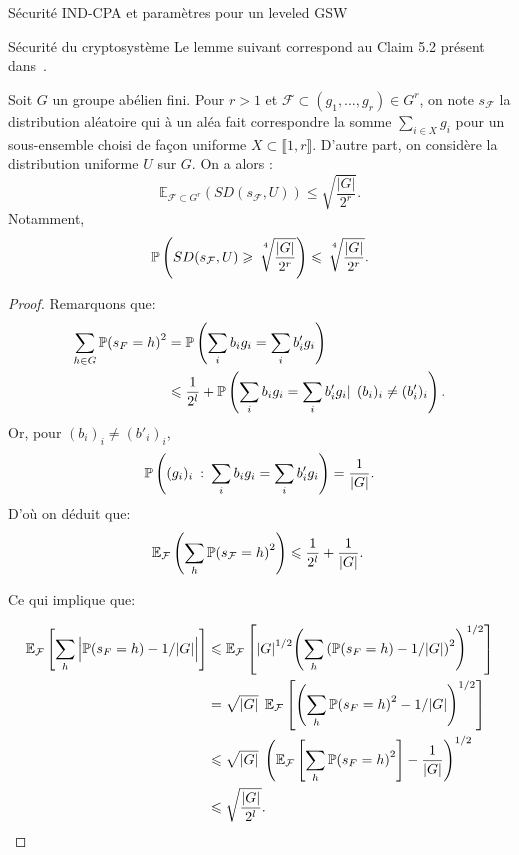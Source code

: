 \begin{section}{Sécurité IND-CPA et paramètres pour un leveled GSW}
\begin{subsection}{Sécurité du cryptosystème}
	Le lemme suivant correspond au Claim 5.2 présent dans~\cite{STOC:Regev05}.

	\begin{lemme}
	Soit $G$ un groupe abélien fini. Pour $r > 1$ et 
	$\mathcal{F} \subset (g_1, \ldots, g_r) \in G^r$, on
	note
	 $s_\mathcal{F}$ la distribution aléatoire qui à un aléa
	 fait correspondre la somme $\sum_{i\in X} g_i$ pour un
	 sous-ensemble choisi de façon uniforme  $X\subset \llbracket
	 1, r \rrbracket$. 
	 D'autre part, on considère la distribution uniforme
	 $U$ sur $G$. On a alors : 
	 \[\mathbb{E}_{\mathcal{F}\subset G^r}(SD(s_\mathcal{F},U)) \leqslant
	   \sqrt{\frac{|G|}{2^r}}.\]
	 Notamment, 
	 \[\mathbb{P}\left(SD(s_\mathcal{F},U) \geqslant
		 \sqrt[\leftroot{-3}\uproot{8}4\:]{\frac{|G|}{2^r}} \right) \leqslant
		 \sqrt[\leftroot{-3}\uproot{8}4\:]{\frac{|G|}{2^r}}.
	 \]
	\end{lemme}
	\begin{proof}
		Remarquons que:
	\begin{align*}
		\sum_{h\in G} {\mathbb{P}(s_F = h)}^2 &= 
		\mathbb{P}\left(\sum_i b_i g_i = \sum_i b'_i g_i\right) \\
		& \leqslant \frac{1}{2^l} + \mathbb{P}
		\left( \sum_i b_i g_i = \sum_i b'_i g_i |\:\: (b_i)_i \neq
		(b'_i)_i \right).
	\end{align*}
	Or, pour $(b_i)_i \neq (b'_i)_i$, 
		\[ \mathbb{P}\left((g_i)_i\: :\: \sum_i b_i g_i = \sum_i b'_i
		g_i\right) = \frac{1}{|G|}.\]
	D'où on déduit que:
	\[\mathbb{E}_\mathcal{F}\left(\sum_h {\PP(s_{\mathcal{F}} =
	h)}^2\right) \leqslant \frac{1}{2^l} + \frac{1}{|G|}. \]

	Ce qui implique que:

\begin{align*}
\mathbb{E}_\mathcal{F}\left[ \sum_h\Big| \mathbb{P}(s_F = h) - 1/|G|\Big| \right] 
&\leqslant
\mathbb{E}_\mathcal{F}
\left[ 
	{|G|}^{1/2}
	{ \left( \sum_h {\left(\mathbb{P}(s_F = h) - 1/|G|\right)}^2
	\right)}^{1/2}
\right] 
\\
&= \sqrt{|G|} \:\:
\mathbb{E}_\mathcal{F}
	\left[ 
	{\left( \sum_h {\mathbb{P}(s_F = h)}^2 - 1/|G|\right)}^{1/2} 
	\right] \\
&\leqslant \sqrt{|G|} \:\:
{\left( 
	\mathbb{E}_\mathcal{F}\left[ \sum_h  {\mathbb{P}(s_F = h)}^2  \right]
- \frac{1}{|G|}
\right)}^{1/2} \\
	&\leqslant \sqrt{\frac{|G|}{2^l}}.
\end{align*}

\end{proof}


\end{subsection}
\end{section}
